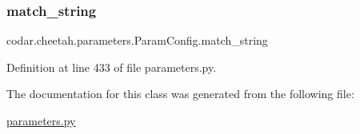 \subsubsection{\texorpdfstring{match\+\_\+string}{match\_string}}
{\footnotesize\ttfamily codar.\+cheetah.\+parameters.\+Param\+Config.\+match\+\_\+string}



Definition at line 433 of file parameters.\+py.



The documentation for this class was generated from the following file\+:\begin{DoxyCompactItemize}
\item 
\hyperlink{parameters_8py}{parameters.\+py}\end{DoxyCompactItemize}
